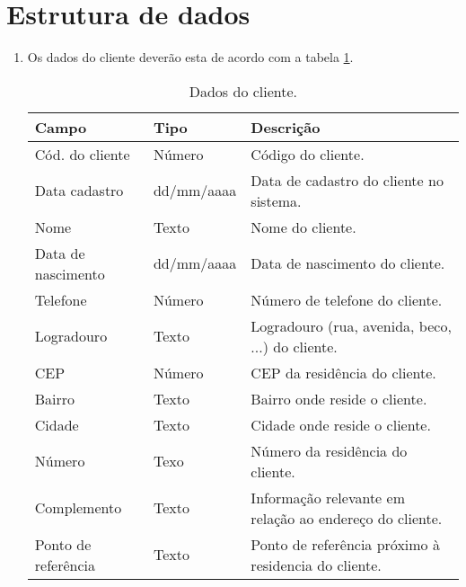 \section{Estrutura de dados}

\begin{enumerate}[label=ED\arabic*]
	\item Os dados do cliente deverão esta de acordo com a tabela \ref{uc013_tb_rn1}. \label{uc013_ed:1}
	\begin{table}[htb]
		\ABNTEXfontereduzida
		\caption[Dados do cliente]{Dados do cliente.}
		\label{uc013_tb_rn1}
		\begin{tabular}{|p{4.0cm}|p{3.0cm}|p{7.25cm}|}
			\hline
			\textbf{Campo}      & \textbf{Tipo} & \textbf{Descrição}                                      \\ \hline
			Cód. do cliente     & Número        & Código do cliente.                                      \\ \hline
			Data cadastro       & dd/mm/aaaa    & Data de cadastro do cliente no sistema.                 \\ \hline
			Nome                & Texto         & Nome do cliente.                                        \\ \hline
			Data de nascimento  & dd/mm/aaaa    & Data de nascimento do cliente.                          \\ \hline
			Telefone            & Número        & Número de telefone do cliente.                          \\ \hline
			Logradouro          & Texto         & Logradouro (rua, avenida, beco, ...) do cliente.        \\ \hline
			CEP                 & Número        & CEP da residência do cliente.                           \\ \hline
			Bairro              & Texto         & Bairro onde reside o cliente.                           \\ \hline
			Cidade              & Texto         & Cidade onde reside o cliente.                           \\ \hline
			Número              & Texo          & Número da residência do cliente.                        \\ \hline
			Complemento         & Texto         & Informação relevante em relação ao endereço do cliente. \\ \hline
			Ponto de referência & Texto         & Ponto de referência próximo à residencia do cliente.    \\ \hline
		\end{tabular}
	\end{table}
\end{enumerate}